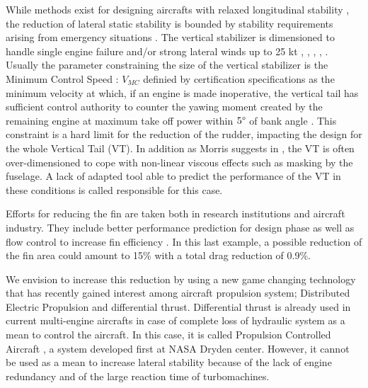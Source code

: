 While methods exist for designing aircrafts with relaxed longitudinal stability \cite{CosenzaHandlingQualities}, the reduction of lateral static stability is bounded by stability requirements arising from emergency situations . The vertical stabilizer is dimensioned to handle single engine failure and/or strong lateral winds up to 25 kt \cite{FeuersangerReducedStability}, \cite{AFC_NASA_report_Mooney}, \cite{NicolosiInvestigationVertical}, \cite{CS25}, \cite{MorrisFlDynCstinMDO}. Usually the parameter constraining the size of the vertical stabilizer is the Minimum Control Speed : $V_{MC}$ definied by certification specifications as the minimum velocity at which, if an engine is made inoperative, the vertical tail has sufficient control authority to counter the yawing moment created by the remaining engine at maximum take off power within $5\SIUnitSymbolDegree$ of bank angle \cite{CS25}. This constraint is a hard limit for the reduction of the rudder, impacting the design for the whole Vertical Tail (VT). In addition as Morris suggests in \cite{MorrisFlDynCstinMDO}, the VT is often over-dimensioned to cope with non-linear viscous effects such as masking by the fuselage. A lack of adapted tool able to predict the performance of the VT in these conditions is called responsible for this case.

Efforts for reducing the fin are taken both in research institutions and aircraft industry. They include better performance prediction for design phase \cite{dellavecchia} as well as flow control to increase fin efficiency \cite{InnovativeFlow_Lin}. In this last example, a possible reduction of the fin area could amount to 15\% with a total drag reduction of 0.9\%.

We envision to increase this reduction by using a new game changing technology that has recently gained interest among aircraft propulsion system; Distributed Electric Propulsion and differential thrust. Differential thrust is already used in current multi-engine aircrafts in case of complete loss of hydraulic system as a mean to control the aircraft. In this case, it is called Propulsion Controlled Aircraft \cite{TouchdownPCA}, a system developed first at NASA Dryden center. However, it cannot be used as a mean to increase lateral stability because of the lack of engine redundancy and of the large reaction time of turbomachines.

